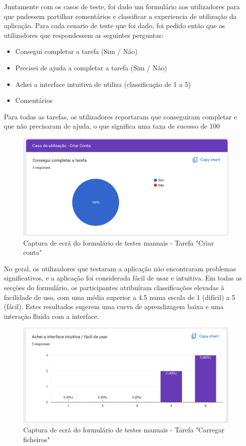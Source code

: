 Juntamente com os casos de teste, foi dado um formulário aos utilizadores para que pudessem partilhar comentários e classificar a experiencia de utilização da aplicação. Para cada cenario de teste que foi dado, foi pedido então que os utilizadores que respondessem as seguintes perguntas:

\begin{itemize}
    \item Consegui completar a tarefa (Sim / Não)
    \item Precisei de ajuda a completar a tarefa (Sim / Não)
    \item Achei a interface intuitiva de utiliza (classificação de 1 a 5)
    \item Comentários
\end{itemize}

Para todas as tarefas, os utilizadores reportaram que conseguiram completar e que não precisaram de ajuda, o que significa uma taxa de sucesso de 100%

\begin{figure}[H]
\centering
\includegraphics[max width=\textwidth]{./img/form1}
\caption{Captura de ecrã do formulário de testes manuais - Tarefa "Criar conta"}
\label{fig:form1}
\end{figure}

No geral, os utilizadores que testaram a aplicação não encontraram problemas significativos, e a aplicação foi considerada fácil de usar e intuitiva. Em todas as secções do formulário, os participantes atribuíram classificações elevadas à facilidade de uso, com uma média superior a 4.5 numa escala de 1 (difícil) a 5 (fácil). Estes resultados sugerem uma curva de aprendizagem baixa e uma interação fluida com a interface.

\begin{figure}[H]
\centering
\includegraphics[max width=\textwidth]{./img/form2}
\caption{Captura de ecrã do formulário de testes manuais - Tarefa "Carregar ficheiros"}
\label{fig:form2}
\end{figure}

